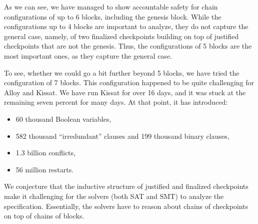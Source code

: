 As we can see, we have managed to show accountable safety for chain
configurations of up to 6 blocks, including the genesis block. While the
configurations up to 4 blocks are important to analyze, they do not capture the
general case, namely, of two finalized checkpoints building on top of justified
checkpoints that are not the genesis. Thus, the configurations of 5 blocks are
the most important ones, as they capture the general case.

To see, whether we could go a bit further beyond 5 blocks, we have tried the
configuration of 7 blocks. This configuration happened to be quite challenging
for Alloy and Kissat. We have run Kissat for over 16 days, and it was stuck
at the remaining seven percent for many days. At that point, it has introduced:

\begin{itemize}
  \item 60 thousand Boolean variables,
  \item 582 thousand ``irredundant'' clauses and 199 thousand binary clauses,
  \item 1.3 billion conflicts,
  \item 56 million restarts.
\end{itemize}

We conjecture that the inductive structure of justified and finalized
checkpoints make it challenging for the solvers (both SAT and SMT) to analyze
the specification. Essentially, the solvers have to reason about chains of
checkpoints on top of chains of blocks.


